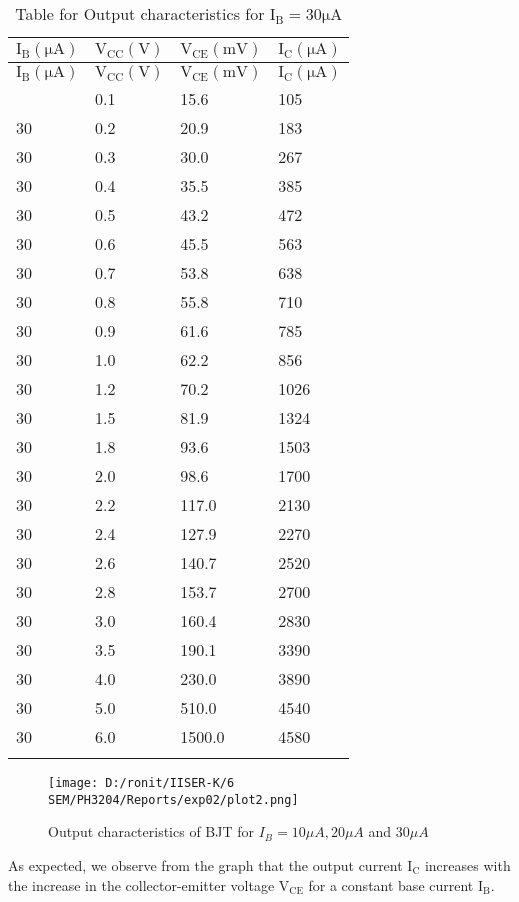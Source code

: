 \documentclass[12pt]{article}
\begin{document}
\begin{longtable}{|l|l|l|l|}
	\hline
    $\mathrm{I_{B}(\mu A)}$ & $\mathrm{V_{CC}(V)}$  & $\mathrm{V_{CE}(mV)}$&  $\mathrm{I_{C}(\mu A)}$ \\ \hline
	\endfirsthead
	\hline
    $\mathrm{I_{B}(\mu A)}$ & $\mathrm{V_{CC}(V)}$& $\mathrm{V_{CE}(mV)}$&  $\mathrm{I_{C}(\mu A)}$ \\ \hline
	\endhead
	\hline
	\endfoot
	\endlastfoot
    30  & 0.1  & 15.6  & 105  \\ \hline
    30  & 0.2  & 20.9  & 183  \\ \hline
    30  & 0.3  & 30.0  & 267  \\ \hline
    30  & 0.4  & 35.5  & 385  \\ \hline
    30  & 0.5  & 43.2  & 472  \\ \hline
    30  & 0.6  & 45.5  & 563  \\ \hline
    30  & 0.7  & 53.8  & 638  \\ \hline
    30  & 0.8  & 55.8  & 710  \\ \hline
    30  & 0.9  & 61.6  & 785  \\ \hline
    30  & 1.0  & 62.2  & 856  \\ \hline
    30  & 1.2  & 70.2  & 1026 \\ \hline
    30  & 1.5  & 81.9  & 1324 \\ \hline
    30  & 1.8  & 93.6  & 1503 \\ \hline
    30  & 2.0  & 98.6  & 1700 \\ \hline
    30  & 2.2  & 117.0 & 2130 \\ \hline
    30  & 2.4  & 127.9 & 2270 \\ \hline
    30  & 2.6  & 140.7 & 2520 \\ \hline
    30  & 2.8  & 153.7 & 2700 \\ \hline
    30  & 3.0  & 160.4 & 2830 \\ \hline
    30  & 3.5  & 190.1 & 3390 \\ \hline
    30  & 4.0  & 230.0 & 3890 \\ \hline
    30  & 5.0  & 510.0 & 4540 \\ \hline
    30  & 6.0  & 1500.0 & 4580 \\ \hline
\caption{Table for Output characteristics for $\mathrm{I_B=30 \mu A}$}
\label{tab:part02_03}
\end{longtable}
\begin{figure}[H]  
    \centering  
    \texttt{[image: D:/ronit/IISER-K/6 SEM/PH3204/Reports/exp02/plot2.png]}  %
    \caption{Output characteristics of BJT for $I_{B}=10\mu A,20\mu A$ and $30\mu A$}  %
    \label{fig:part01_02}  %
  \end{figure}\noindent
As expected, we observe from the graph that the output current $\mathrm{I_C}$ increases with the increase in the collector-emitter voltage $\mathrm{V_{CE}}$ for a constant base current $\mathrm{I_B}$.
\end{document}
